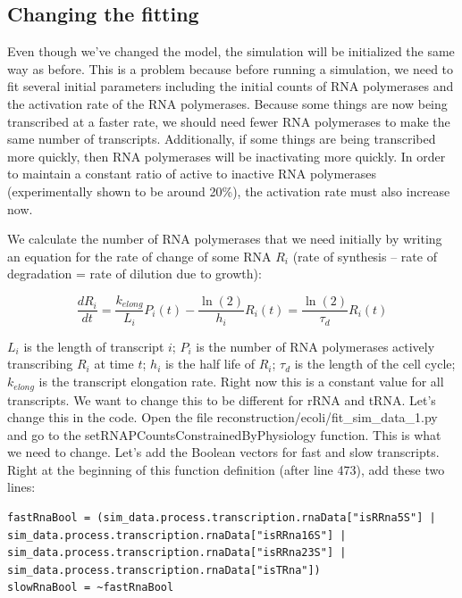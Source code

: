 \documentclass[12pt]{article}
\begin{document}
\subsection{Changing the fitting}

Even though we've changed the model, the simulation will be initialized the same way as before. This is a problem because before running a simulation, we need to fit several initial parameters including the initial counts of RNA polymerases and the activation rate of the RNA polymerases. Because some things are now being transcribed at a faster rate, we should need fewer RNA polymerases to make the same number of transcripts. Additionally, if some things are being transcribed more quickly, then RNA polymerases will be inactivating more quickly. In order to maintain a constant ratio of active to inactive RNA polymerases (experimentally shown to be around 20\%), the activation rate must also increase now. 

\par

We calculate the number of RNA polymerases that we need initially by writing an equation for the rate of change of some RNA $R_i$ (rate of synthesis – rate of degradation = rate of dilution due to growth):

$$
\frac{d R_i}{dt} = \frac{k_{elong}}{L_i}P_i(t) - \frac{\ln(2)}{h_i}R_i(t) = \frac{\ln(2)}{\tau_d}R_i(t)
$$


$L_i$ is the length of transcript $i$; $P_i$ is the number of RNA polymerases actively transcribing $R_i$ at time $t$; $h_i$ is the half life of $R_i$; $\tau_d$ is the length of the cell cycle; $k_{elong}$ is the transcript elongation rate. Right now this is a constant value for all transcripts. We want to change this to be different for rRNA and tRNA. Let’s change this in the code. Open the file reconstruction/ecoli/fit_sim_data_1.py and go to the setRNAPCountsConstrainedByPhysiology function. This is what we need to change. Let’s add the Boolean vectors for fast and slow transcripts. Right at the beginning of this function definition (after line 473), add these two lines:

\lstset{language=Python}
\begin{lstlisting}
fastRnaBool = (sim_data.process.transcription.rnaData["isRRna5S"] | sim_data.process.transcription.rnaData["isRRna16S"] | sim_data.process.transcription.rnaData["isRRna23S"] | sim_data.process.transcription.rnaData["isTRna"])
slowRnaBool = ~fastRnaBool
\end{lstlisting}
\end{document}
